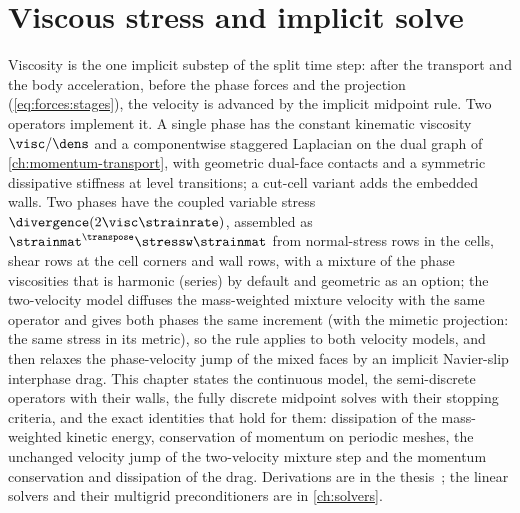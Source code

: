 \chapter{Viscous stress and implicit solve}\label{ch:viscosity}
Viscosity is the one implicit substep of the split time step: after the
transport and the body acceleration, before the phase forces and the
projection (\cref{eq:forces:stages}), the velocity is advanced by the
implicit midpoint rule. Two operators implement it. A single phase has the
constant kinematic viscosity $\visc/\dens$ and a componentwise staggered
Laplacian on the dual graph of \cref{ch:momentum-transport}, with geometric
dual-face contacts and a symmetric dissipative stiffness at level transitions;
a cut-cell variant adds the embedded walls. Two phases have the
coupled variable stress $\divergence(2\visc\strainrate)$, assembled as
$\strainmat^{\transpose}\stressw\strainmat$ from normal-stress rows in the
cells, shear rows at the cell corners and wall rows, with a mixture of the
phase viscosities that is harmonic (series) by default and geometric as an
option; the two-velocity model diffuses the mass-weighted mixture velocity with
the same operator and gives both phases the same increment (with the mimetic
projection: the same stress in its metric), so the rule applies
to both velocity models, and then relaxes the phase-velocity jump of the
mixed faces by an implicit Navier-slip interphase drag. This chapter
states the continuous model, the semi-discrete operators with their walls,
the fully discrete midpoint solves with their stopping criteria, and the
exact identities that hold for them: dissipation of the mass-weighted
kinetic energy, conservation of momentum on periodic meshes, the
unchanged velocity jump of the two-velocity mixture step and the momentum
conservation and dissipation of the drag. Derivations are in the
thesis~; the linear solvers and their multigrid
preconditioners are in \cref{ch:solvers}.

